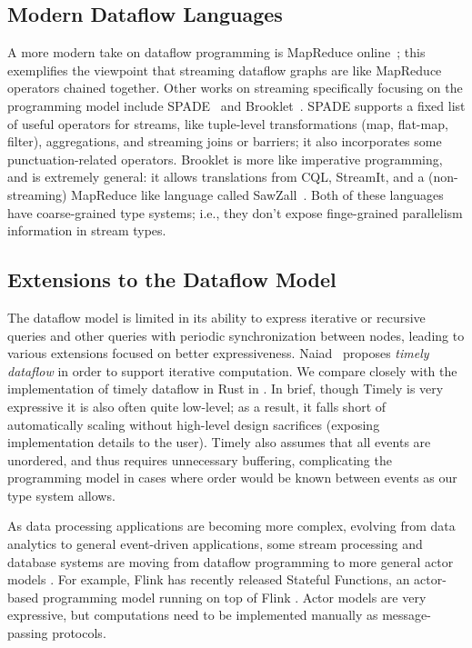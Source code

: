 \subsection{Modern Dataflow Languages}

A more modern take on dataflow programming is MapReduce online~\cite{condie2010mapreduce}; this exemplifies the viewpoint that streaming dataflow graphs are like MapReduce operators chained together.
Other works on streaming specifically focusing on the programming model include SPADE~\cite{gedik2008spade} and Brooklet~\cite{soule2010universal}.
SPADE supports a fixed list of useful operators for streams, like tuple-level transformations (map, flat-map, filter), aggregations, and streaming joins or barriers; it also incorporates some punctuation-related operators.
Brooklet is more like imperative programming,
and is extremely general: it allows translations from CQL, StreamIt, and a (non-streaming) MapReduce like language called SawZall~\cite{pike2005interpreting}.
Both of these languages have coarse-grained type systems;
i.e., they don't expose finge-grained parallelism information in stream types.

\subsection{Extensions to the Dataflow Model}

The dataflow model is limited in its ability to express iterative or recursive queries and other queries with periodic synchronization between nodes, leading to various extensions focused on better expressiveness.
Naiad~\cite{Naiad2013,Timely} proposes \emph{timely dataflow} in order
to support iterative computation.
We compare closely with the implementation of timely dataflow in Rust in .
In brief, though Timely is very expressive it is also often quite low-level; as a result, it falls short of automatically scaling without high-level design sacrifices (exposing implementation details to the user).
Timely also assumes that all events are unordered, and thus requires unnecessary buffering, complicating the programming model in cases where order would be known between events as our type system allows.

As data processing applications are becoming more complex, evolving from
data analytics to general event-driven applications, some stream
processing and database systems are moving from dataflow programming to more
general actor models
\cite{CarboneFKK20,Bernstein19,BernsteinDKM17,Das2018,xu2021move}.
For example, Flink has recently released Stateful Functions,
an actor-based programming model running on top of Flink
\cite{AkhterFK19,StatefulFunctions}.
Actor models are very expressive, but computations need to be implemented manually as
message-passing protocols.

